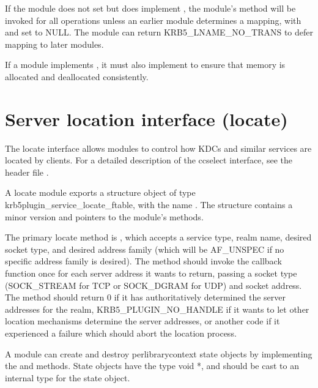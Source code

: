 \documentclass[letterpaper,10pt,english]{sphinxmanual}
\begin{document}
\sphinxAtStartPar
If the module does not set  but does implement
, the module’s  method will be invoked for all
 operations unless an earlier module
determines a mapping, with  and  set to NULL.  The
module can return KRB5\_LNAME\_NO\_TRANS to defer mapping to later
modules.

\sphinxAtStartPar
If a module implements , it must also implement
 to ensure that memory is allocated and deallocated
consistently.


\section{Server location interface (locate)}
\label{\detokenize{plugindev/locate:server-location-interface-locate}}\label{\detokenize{plugindev/locate::doc}}
\sphinxAtStartPar
The locate interface allows modules to control how KDCs and similar
services are located by clients.  For a detailed description of the
ccselect interface, see the header file .

\sphinxAtStartPar
A locate module exports a structure object of type
krb5plugin\_service\_locate\_ftable, with the name .
The structure contains a minor version and pointers to the module’s
methods.

\sphinxAtStartPar
The primary locate method is , which accepts a service type,
realm name, desired socket type, and desired address family (which
will be AF\_UNSPEC if no specific address family is desired).  The
method should invoke the callback function once for each server
address it wants to return, passing a socket type (SOCK\_STREAM for TCP
or SOCK\_DGRAM for UDP) and socket address.  The  method
should return 0 if it has authoritatively determined the server
addresses for the realm, KRB5\_PLUGIN\_NO\_HANDLE if it wants to let
other location mechanisms determine the server addresses, or another
code if it experienced a failure which should abort the location
process.

\sphinxAtStartPar
A module can create and destroy per\sphinxhyphen{}library\sphinxhyphen{}context state objects by
implementing the  and  methods.  State objects have
the type void *, and should be cast to an internal type for the state
object.
\end{document}

